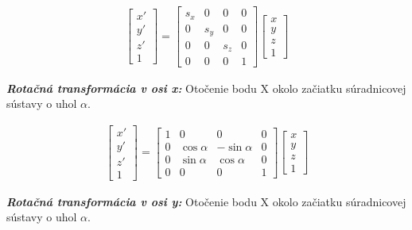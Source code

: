 \begin{equation}
\label{eq_kalib_scale}
\begin{aligned}
\begin{bmatrix}
x' \\ y' \\ z' \\ 1 
\end{bmatrix}
=
\begin{bmatrix}
s_x & 0 & 0 & 0 \\
0 & s_y & 0 & 0 \\
0 & 0 & s_z & 0 \\
0 & 0 & 0 & 1 
\end{bmatrix}
\begin{bmatrix}
x \\ y \\ z \\ 1 
\end{bmatrix}
\end{aligned}
\end{equation}

\textbf{\textit{Rotačná transformácia v osi x:}}  Otočenie bodu X okolo začiatku súradnicovej sústavy o uhol $\alpha$.

\begin{equation}
\label{eq_kalib_rotat_x}
\begin{aligned}
\begin{bmatrix}
x' \\ y' \\ z' \\ 1 
\end{bmatrix}
=
\begin{bmatrix}
1 & 0 & 0 & 0 \\
0 & \cos\alpha & -\sin\alpha & 0 \\
0 & \sin\alpha & \cos\alpha & 0 \\
0 & 0 & 0 & 1 
\end{bmatrix}
\begin{bmatrix}
x \\ y \\ z \\ 1 
\end{bmatrix}
\end{aligned}
\end{equation}

\newpage
\textbf{\textit{Rotačná transformácia v osi y:}}  Otočenie bodu X okolo začiatku súradnicovej sústavy o uhol $\alpha$.

